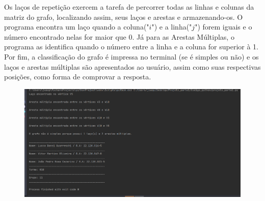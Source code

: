 \documentclass{article}
\begin{document}
	 Os laços de repetição exercem a tarefa de percorrer todas as linhas e colunas da matriz do grafo, localizando assim, seus laços e arestas e armazenando-os. O programa encontra um laço quando a coluna("$i$") e a linha("$j$") forem iguais e o número encontrado nelas for maior que 0. Já para as Arestas Múltiplas, o programa as identifica quando o número entre a linha e a coluna for superior à 1. Por fim, a classificação do grafo é impressa no terminal (se é simples ou não) e os laços e arestas múltiplas são apresentados ao usuário, assim como suas respectivas posições, como forma de comprovar a resposta.
	 
\begin{figure}[H]
	\centering
	\includegraphics[width=0.5\linewidth]{"Figuras/Saida - Programa"}
	\label{fig:saidaprograma}
\end{figure}
	 
	 
\end{document}
